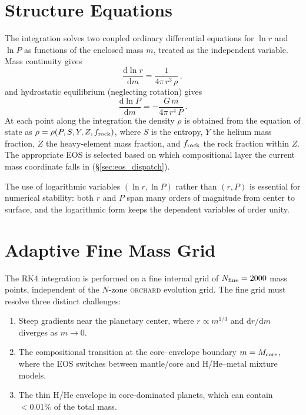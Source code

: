 \documentclass{aastex631}
\newcommand{\dd}{\mathrm{d}}
\newcommand{\Mcore}{M_{\rm core}}
\newcommand{\orchard}{\textsc{orchard}}
\begin{document}
\section{Structure Equations}\label{sec:equations}

The integration solves two coupled ordinary differential equations for
$\ln r$ and $\ln P$ as functions of the enclosed mass $m$, treated as the
independent variable.  Mass continuity gives
\begin{equation}\label{eq:dlnr}
  \frac{\dd \ln r}{\dd m}
  = \frac{1}{4\pi\,r^{3}\,\rho}\,,
\end{equation}
and hydrostatic equilibrium (neglecting rotation) gives
\begin{equation}\label{eq:dlnP}
  \frac{\dd \ln P}{\dd m}
  = -\frac{G\,m}{4\pi\,r^{4}\,P}\,.
\end{equation}
At each point along the integration the density $\rho$ is obtained from
the equation of state as $\rho = \rho(P, S, Y, Z, f_{\rm rock})$, where
$S$ is the entropy, $Y$ the helium mass fraction, $Z$ the heavy-element
mass fraction, and $f_{\rm rock}$ the rock fraction within $Z$.  The
appropriate EOS is selected based on which compositional layer the
current mass coordinate falls in (\S\ref{sec:eos_dispatch}).

The use of logarithmic variables $(\ln r, \ln P)$ rather than $(r, P)$
is essential for numerical stability: both $r$ and $P$ span many orders
of magnitude from center to surface, and the logarithmic form keeps the
dependent variables of order unity.

\section{Adaptive Fine Mass Grid}\label{sec:grid}

The RK4 integration is performed on a fine internal grid of
$N_{\rm fine} = 2000$ mass points, independent of the $N$-zone
\orchard{} evolution grid.  The fine grid must resolve three distinct
challenges:
\begin{enumerate}
  \item Steep gradients near the planetary center, where $r \propto
    m^{1/3}$ and $\dd r / \dd m$ diverges as $m \to 0$.
  \item The compositional transition at the core--envelope boundary
    $m = \Mcore$, where the EOS switches between mantle/core
    and H/He--metal mixture models.
  \item The thin H/He envelope in core-dominated planets, which can
    contain $< 0.01\%$ of the total mass.
\end{enumerate}
\end{document}
